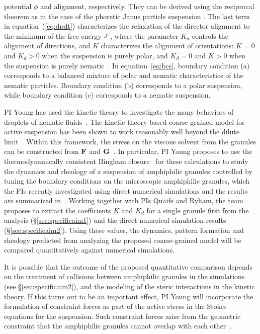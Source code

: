 potential $\phi$ and alignment, respectively. They can be derived using
the reciprocal theorem as in the case of the phoretic Janus particle
suspension \cite{TraversoMichellin2020_PRF,TraversoMichellin2022_JFM}.
The last term in equation~(\ref{eq:dpdt}) characterizes the relaxation
of the director alignment to the minimum of the free energy ${\cal F}$,
where the parameter $K_d$ controls the alignment of directions, and $K$
characterizes the alignment of orientations: $K=0$ and $K_d > 0$ when
the suspension is purely polar, and $K_d=0$ and $K>0$ when the
suspension is purely nematic~\cite{Amiri2022_JPhysA}. 
%
In equation~\eqref{eq:bcs}, boundary condition (a) corresponds to a
balanced mixture of polar and nematic characteristics of the nematic
particles. Boundary condition (b) corresponds to a polar suspension,
while boundary condition (c) corresponds to a nematic suspension. 

PI Young has used the kinetic theory to investigate the many behaviors
of droplets of nematic fluids~\cite{YoungShelleyStein2021_MBE}. The
kinetic-theory based coarse-grained model for active suspension has been
shown to work reasonably well beyond the dilute
limit~\cite{Saintillan2018_ARFM}. Within this framework, the stress on
the viscous solvent from the granules can be constructed from ${\bf F}$
and ${\bf G}$~\cite{TraversoMichellin2020_PRF,
TraversoMichellin2022_JFM}. In particular, PI Young proposes to use the
thermodynamically consistent Bingham
closure~\cite{YoungShelleyStein2021_MBE} for these calculations to study
the dynamics and rheology of a suspension of amphiphilic granules
controlled by tuning the boundary conditions on the microscopic
amphiphilic granules, which the PIs recently investigated using direct
numerical simulations and the results are summarized
in~\cite{fu-ryh-qua-you2022}. Working together with PIs Quaife and
Ryham, the team proposes to extract the coefficients $K$ and $K_d$ for a
single granule first from the analysis (\S\ref{sec:specificaim1}) and
the direct numerical simulation results (\S\ref{sec:specificaim2}).
Using these values, the dynamics, pattern formation and rheology
predicted from analyzing the proposed coarse-grained model will be
compared quantitatively against numerical simulations. 

It is possible that the outcome of the proposed quantitative comparison
depends on the treatment of collisions between amphiphilic granules in
the simulations (see \S\ref{sec:specificaim2}), and the modeling of the
steric interactions in the kinetic theory. If this turns out to be an
important effect, PI Young will incorporate the formulation of
constraint forces as part of the active stress in the Stokes equations
for the suspension. Such constraint forces arise from the geometric
constraint that the amphiphilic granules cannot overlap with each
other~\cite{Weady2022_PRF}. 


